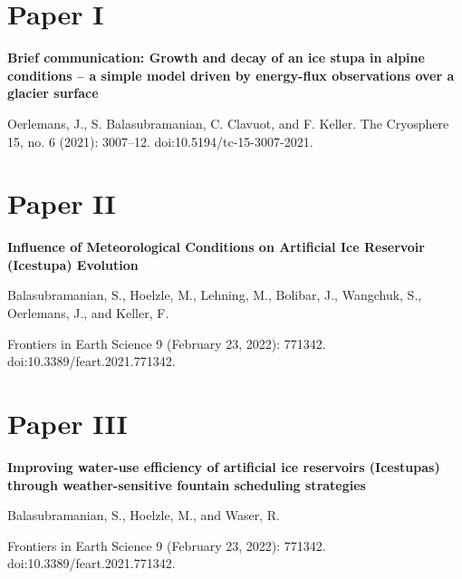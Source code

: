 \chapter{Paper I}
\vfil\null
\huge{\textbf{Brief communication: Growth and decay of an ice stupa in alpine conditions – a simple model driven by energy-flux observations over a glacier surface}}

\bigskip
\large{
Oerlemans, J., S. Balasubramanian, C. Clavuot, and F. Keller. The Cryosphere 15, no. 6 (2021): 3007–12. doi:10.5194/tc-15-3007-2021.
  }



\chapter{Paper II}
\vfil\null
\huge{\textbf{Influence of Meteorological Conditions on Artificial Ice Reservoir (Icestupa) Evolution}}

\bigskip
\large{Balasubramanian, S., Hoelzle, M., Lehning, M., Bolibar, J., Wangchuk, S.,
  Oerlemans, J., and Keller, F. \par  Frontiers in Earth Science 9 (February 23, 2022): 771342.
doi:10.3389/feart.2021.771342.}



\chapter{Paper III}
\vfil\null
\huge{\textbf{Improving water-use efficiency of artificial ice reservoirs (Icestupas) through weather-sensitive fountain scheduling
strategies}}

\bigskip
\large{Balasubramanian, S., Hoelzle, M., and Waser, R. \par  Frontiers in Earth Science 9 (February 23, 2022): 771342. doi:10.3389/feart.2021.771342.}



